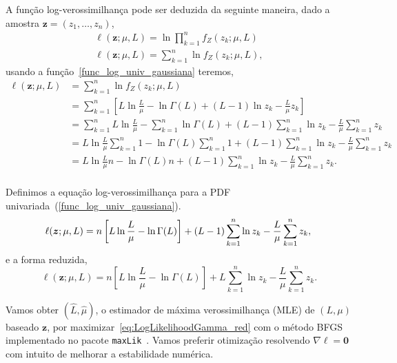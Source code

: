 A função log-verossimilhança pode ser deduzida da seguinte maneira, dado a amostra $\bm z = (z_1,\dots,z_n)$, 
\begin{equation}\nonumber
\begin{split}
  \ell(\bm z;\mu, L)=\ln\prod_{k=1}^{n}f_Z(z_k;\mu,L)\\
  \ell(\bm z;\mu, L)=\sum_{k=1}^{n}\ln f_Z(z_k;\mu,L),
 \end{split}
 \end{equation}
usando a função~\eqref{func_log_univ_gaussiana} teremos,
\begin{equation}\nonumber
\begin{split}
    \ell(\bm z;\mu, L)&=\sum_{k=1}^{n}\ln f_Z(z_k;\mu,L)\\
                      &=\sum_{k=1}^{n}\left[L\ln\frac{L}{\mu}-\ln\Gamma(L)+(L-1)\ln z_k - \frac{L}{\mu} z_k\right]\\
                      &=\sum_{k=1}^{n}L\ln\frac{L}{\mu}-\sum_{k=1}^{n}\ln\Gamma(L)+(L-1)\sum_{k=1}^{n}\ln z_k - \frac{L}{\mu}\sum_{k=1}^{n} z_k\\
                      &=L\ln\frac{L}{\mu}\sum_{k=1}^{n}1-\ln\Gamma(L)\sum_{k=1}^{n}1+(L-1)\sum_{k=1}^{n}\ln z_k - \frac{L}{\mu}\sum_{k=1}^{n} z_k\\
                      &=L\ln\frac{L}{\mu}n-\ln\Gamma(L)n+(L-1)\sum_{k=1}^{n}\ln z_k - \frac{L}{\mu}\sum_{k=1}^{n} z_k.\\                
 \end{split}
 \end{equation}

Definimos a equação log-verossimilhança para a PDF univariada~(\ref{func_log_univ_gaussiana}).
\begin{equation}\nonumber
    \ell(\bm z;\mu, L)=n\left[L\ln\frac{L}{\mu}-\ln\Gamma(L)\right]+(L-1)\sum_{k=1}^{n}\ln z_k - \frac{L}{\mu}\sum_{k=1}^{n} z_k,\\                
 \end{equation}
e a forma reduzida, 
\begin{equation}
\ell(\bm z;\mu, L) = 
n \left[L\ln \frac{L}{\mu} - \ln \Gamma(L)\right]
+L \sum_{k=1}^{n}\ln z_k -\frac{L}{\mu}\sum_{k=1}^{n} z_k.
\label{eq:LogLikelihoodGamma_red}
\end{equation}


Vamos obter $(\widehat L, \widehat \mu)$, o estimador de máxima verossimilhança (MLE) de $(L, \mu)$ baseado $\bm z$, por maximizar~\eqref{eq:LogLikelihoodGamma_red} com o método BFGS implementado no pacote \texttt{maxLik}~\citep{ht}. Vamos preferir otimização resolvendo $\nabla\ell=\bm 0$ com intuito de melhorar a estabilidade numérica.

